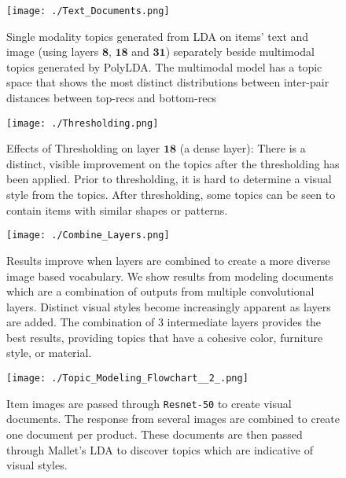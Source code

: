 \documentclass[10pt,twocolumn,letterpaper]{article}
\begin{document}
\begin{figure*}[t]
\centering
\texttt{[image: ./Text\_Documents.png]}
\caption{Single modality topics generated from LDA on items' text and image (using layers $\mathbf{8}$, $\mathbf{18}$ and $\mathbf{31}$) separately beside multimodal topics generated by PolyLDA. The multimodal model has a topic space that shows the most distinct distributions between inter-pair distances between top-recs and bottom-recs}
\label{fig:Multimodal_Topics}
\end{figure*}




\begin{figure}[htp]
\centering
        \texttt{[image: ./Thresholding.png]}
\caption{Effects of Thresholding on layer $\mathbf{18}$ (a dense layer): There is a distinct, visible improvement on the topics after the thresholding has been applied. Prior to thresholding, it is hard to determine a visual style from the topics. After thresholding, some topics can be seen to contain items with similar shapes or patterns.}
\label{fig:Thresholding}
\end{figure}

\begin{figure}[htp]
\centering
        \texttt{[image: ./Combine\_Layers.png]}
\caption{Results improve when layers are combined to create a more diverse image based vocabulary. We show results from modeling documents which are a combination of outputs from multiple convolutional layers. Distinct visual styles become increasingly apparent as layers are added. The combination of 3 intermediate layers provides the best results, providing topics that have a cohesive color, furniture style, or material.}
\label{fig:Combining_Layers}
\end{figure}

\begin{figure}[htp]
\centering
        \texttt{[image: ./Topic\_Modeling\_Flowchart\_\_2\_.png]}
\caption{Item images are passed through {\tt Resnet-50} to create visual documents. The response from several images are combined to create one document per product. These documents are then passed through Mallet's LDA to discover topics which are indicative of visual styles.}
\vspace{1mm}
\label{fig:Topic_Modeling_Flowchart}
\end{figure}

{\footnotesize


}
\end{document}
